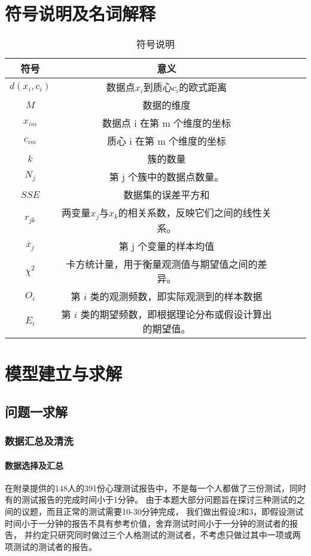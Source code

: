 \documentclass[withoutpreface,bwprint]{cumcmthesis} %
\begin{document}
\section{符号说明及名词解释}
\begin{table}[!htbp]
    \caption{符号说明}\label{tab:001}  \centering
    \begin{tabular}{ccccc}
        \toprule[1.5pt]
        符号 & 意义  \\
        \midrule[1pt]
        $d(x_i, c_i)$ & 数据点$x_i$到质心$c_i$的欧式距离 \\  
        $M$ & 数据的维度 \\   
        $x_{im}$ & 数据点 i 在第 m 个维度的坐标 \\
        $c_{im}$ & 质心 i 在第 m 个维度的坐标 \\
        $k$ & 簇的数量 \\
        $N_j$ &  第 j 个簇中的数据点数量。 \\
        $SSE$ & 数据集的误差平方和 \\
        $r_{jk}$ & 两变量$x_j$与$x_k$的相关系数，反映它们之间的线性关系。\\
        $\overline{x}_j $ & 第 j 个变量的样本均值 \\
        $ \chi^2 $ & 卡方统计量，用于衡量观测值与期望值之间的差异。\\
        $ O_i $ & 第 \(i\) 类的观测频数，即实际观测到的样本数据\\
        $ E_i $ & 第 \(i\) 类的期望频数，即根据理论分布或假设计算出的期望值。\\
        \bottomrule[1.5pt]
    \end{tabular}
\end{table}

\section{模型建立与求解}

\subsection{问题一求解}

\subsubsection{数据汇总及清洗}
\paragraph*{数据选择及汇总}
在附录提供的148人的391份心理测试报告中，不是每一个人都做了三份测试，同时有的测试报告的完成时间小于1分钟。
由于本题大部分问题旨在探讨三种测试的之间的议题，而且正常的测试需要10-30分钟完成\cite{SCL-90}\cite{The Career Development Quarterly}\cite{The Big Five trait taxonomy}，
我们做出假设2和3，即假设测试时间小于一分钟的报告不具有参考价值，舍弃测试时间小于一分钟的测试者的报告，
并约定只研究同时做过三个人格测试的测试者，不考虑只做过其中一项或两项测试的测试者的报告。
\end{document}
